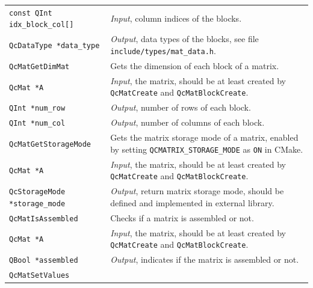 \documentclass[a4paper,11pt,twoside,openright]{book}
\begin{document}
\begin{center}
\begin{longtable}{l|p{}}
    \hspace*{2ex}\verb|const QInt idx_block_col[]| %
      & \textsl{Input}, column indices of the blocks.\\
    \hspace*{2ex}\verb|QcDataType *data_type| %
      & \textsl{Output}, data types of the blocks, see file
        \verb|include/types/mat_data.h|.\\
    \hline
%
    \verb|QcMatGetDimMat|\index{\texttt{QcMatGetDimMat}} %
      & Gets the dimension of each block of a matrix.\\
    \hspace*{2ex}\verb|QcMat *A| %
      & \textsl{Input}, the matrix, should be at least created by \verb|QcMatCreate|
        and \verb|QcMatBlockCreate|.\\
    \hspace*{2ex}\verb|QInt *num_row| %
      & \textsl{Output}, number of rows of each block.\\
    \hspace*{2ex}\verb|QInt *num_col| %
      & \textsl{Output}, number of columns of each block.\\
    \hline
%
    \verb|QcMatGetStorageMode|\index{\texttt{QcMatGetStorageMode}} %
      & Gets the matrix storage mode of a matrix, enabled by setting
        \verb|QCMATRIX_STORAGE_MODE| as \verb|ON| in CMake.\\
    \hspace*{2ex}\verb|QcMat *A| %
      & \textsl{Input}, the matrix, should be at least created by \verb|QcMatCreate|
        and \verb|QcMatBlockCreate|.\\
    \hspace*{2ex}\verb|QcStorageMode *storage_mode| %
      & \textsl{Output}, return matrix storage mode, should be defined and
        implemented in external library.\\
    \hline
%
    \verb|QcMatIsAssembled|\index{\texttt{QcMatIsAssembled}} %
      & Checks if a matrix is assembled or not.\\
    \hspace*{2ex}\verb|QcMat *A| %
      & \textsl{Input}, the matrix, should be at least created by \verb|QcMatCreate|
        and \verb|QcMatBlockCreate|.\\
    \hspace*{2ex}\verb|QBool *assembled| %
      & \textsl{Output}, indicates if the matrix is assembled or not.\\
    \hline
%
    \verb|QcMatSetValues|\index{\texttt{QcMatSetValues}} %

\end{longtable}
\end{center}
\end{document}
